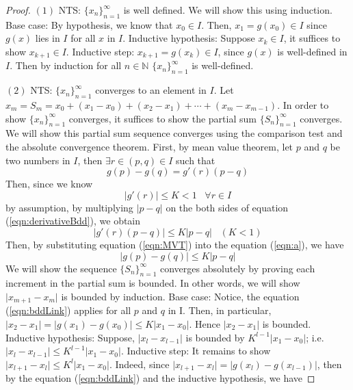 \documentclass{article}
\theoremstyle{definition}
\theoremstyle{remark}
\begin{document}
\begin{proof}
    $(1)$ NTS: $\{x_n\}_{n = 1}^{\infty}$ is well defined. \; We will show this using induction. Base case: By hypothesis, we know that $x_0 \in I$. Then, $x_1 = g(x_0) \in I$ since $g(x)$ lies in $I$ for all $x$ in $I$. Inductive hypothesis: Suppose $x_k \in I$, it suffices to show $x_{k+1} \in I$. Inductive step: $x_{k+1} = g(x_k) \in I$, since $g(x)$ is well-defined in $I$. Then by induction for all $n \in \mathbb{N}$ $\{x_n\}_{n = 1}^{\infty}$ is well-defined.
    
    $(2)$ NTS: $\{x_n\}_{n = 1}^{\infty}$ converges to an element in $I$. \; Let $x_m = S_m = x_0 + (x_1 - x_0) + (x_2 - x_1) + \cdots + (x_m - x_{m-1})$. In order to show $\{x_n\}_{n = 1}^{\infty}$ converges, it suffices to show the partial sum $\{S_n\}_{n = 1}^{\infty}$ converges. We will show this partial sum sequence converges using the comparison test and the absolute convergence theorem. First, by mean value theorem, let $p$ and $q$ be two numbers in $I$, then $\exists r \in (p,q) \in I$ such that
    \begin{equation}\label{eqn:MVT}
        g(p) - g(q) = g'(r)(p - q)
    \end{equation}
    Then, since we know 
    \begin{equation}\label{eqn:derivativeBdd}
        \lvert g'(r) \rvert \leq K < 1 \;\;\; \forall r \in I
    \end{equation}
    by assumption, by multiplying $\lvert p - q \rvert$ on the both sides of equation (\ref{eqn:derivativeBdd}), we obtain 
    \begin{equation}\label{eqn:a}
        \lvert g'(r)(p-q) \rvert \leq K \lvert p - q \rvert \;\;\; (K < 1)
    \end{equation}
    Then, by substituting equation (\ref{eqn:MVT}) into the equation (\ref{eqn:a}), we have 
    \begin{equation}\label{eqn:bddLink}
        \lvert g(p) - g(q) \rvert \leq K \lvert p - q \rvert
    \end{equation}
    We will show the sequence $\{S_n\}_{n = 1}^{\infty}$ converges absolutely by proving each increment in the partial sum is bounded. In other words, we will show $\lvert x_{m+1} - x_{m}\rvert$ is bounded by induction. Base case: Notice, the equation (\ref{eqn:bddLink}) applies for all $p$ and $q$ in I. Then, in particular, $\lvert x_2 - x_1 \rvert = \lvert g(x_1) - g(x_0) \rvert \leq K \lvert x_1 - x_0 \rvert$. Hence $\lvert x_2 - x_1 \rvert$ is bounded. Inductive hypothesis: Suppose, $\lvert x_{l} - x_{l-1} \rvert$ is bounded by $K^{l-1} \rvert x_1 - x_0 \rvert$; i.e. $\lvert x_{l} - x_{l-1} \rvert \leq K^{l-1} \rvert x_1 - x_0 \rvert$. Inductive step: It remains to show $\lvert x_{l+1} - x_{l} \rvert \leq K^{l} \rvert x_1 - x_0 \rvert$. Indeed, since $\rvert x_{l + 1} - x_l \rvert = \lvert g(x_l) - g(x_{l-1}) \rvert$, then by the equation (\ref{eqn:bddLink}) and the inductive hypothesis, we have

\end{proof}
\end{document}
